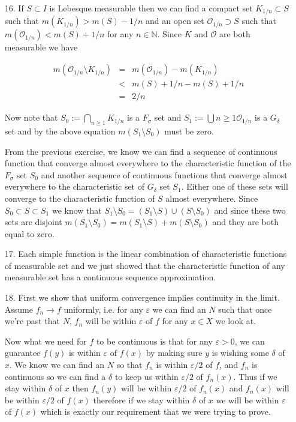\documentclass[oneside]{book}
\begin{document}
\begin{enumerate}
\item[16.] If $S \subset I$ is Lebesque measurable then we can find a compact set $K_{1/n} \subset S$ such that $m(K_{1/n}) > m(S) - 1/n$ and an open set $\mathcal{O}_{1/n} \supset S$ such that $m(\mathcal{O}_{1/n}) < m(S) + 1/n$ for any $n \in \mathbb{N}$. Since $K$ and $\mathcal{O}$ are both measurable we have

\begin{eqnarray}
m(\mathcal{O}_{1/n} \setminus K_{1/n}) &=& m(\mathcal{O}_{1/n}) - m(K_{1/n}) \nonumber \\
&<& m(S)+1/n - m(S) +1/n \nonumber\\
&=& 2/n
\end{eqnarray}

Now note that $S_0 := \bigcap_{n \ge 1} K_{1/n}$ is a $F_\sigma$ set and $S_1 := \bigcup{n \ge 1} \mathcal{O}_{1/n}$ is a $G_\delta$ set and by the above equation $m(S_1 \setminus S_0)$ must be zero.

From the previous exercise, we know we can find a sequence of continuous function that converge almost everywhere to the characteristic function of the $F_\sigma$ set $S_0$ and another sequence of continuous functions that converge almost everywhere to the characteristic set of $G_\delta$ set $S_1$. Either one of these sets will converge to the characteristic function of $S$ almost everywhere. Since $S_0 \subset S \subset S_1$ we know that $S_1 \setminus S_0 = (S_1 \setminus S) \cup (S \setminus S_0)$ and since these two sets are disjoint $m(S_1 \setminus S_0) = m(S_1 \setminus S)+m(S \setminus S_0)$ and they are both equal to zero.

\item[17.] Each simple function is the linear combination of characteristic functions of measurable set and we just showed that the characteristic function of any measurable set has a continuous sequence approximation. 

\item[18.] First we show that uniform convergence implies continuity in the limit. Assume $f_n \to f$ uniformly, i.e. for any $\varepsilon$ we can find an $N$ such that once we're past that $N$, $f_n$ will be within $\varepsilon$ of $f$ for any $x \in X$ we look at. 

Now what we need for $f$ to be continuous is that for any $\varepsilon > 0$, we can guarantee $f(y)$ is within $\varepsilon$ of $f(x)$ by making sure $y$ is wishing some $\delta$ of $x$. We know we can find an $N$ so that $f_n$ is within $\varepsilon/2$ of $f$, and $f_n$ is continuous so we can find a $\delta$ to keep us within $\varepsilon/2$ of $f_n(x)$. Thus if we stay within $\delta$ of $x$ then $f_n(y)$ will be within $\varepsilon/2$ of $f_n(x)$ and $f_n(x)$ will be within $\varepsilon/2$ of $f(x)$ therefore if we stay within $\delta$ of $x$ we will be within $\varepsilon$ of $f(x)$ which is exactly our requirement that we were trying to prove.


\end{enumerate}
\end{document}
